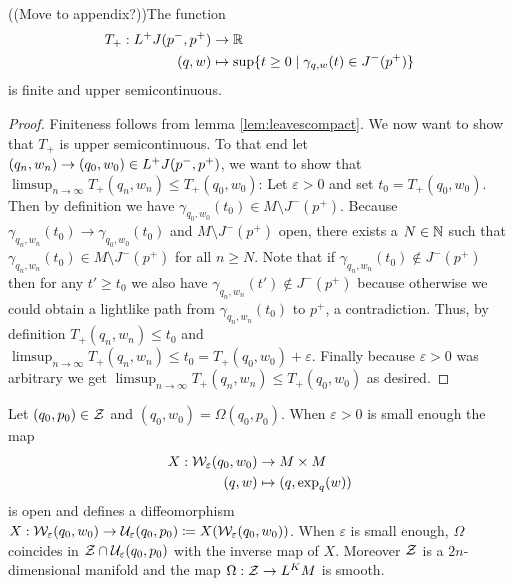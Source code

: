 \begin{lemma}\label{lem:Tprop}
    ((Move to appendix?))The function
    \begin{align*}
        T_+:L^+J(p^-,p^+)&\to \mathbb{R} \\
        (q,w)&\mapsto \sup \{ t\ge 0 \mid \gamma_{q,w}(t)\in J^-(p^+)\}
    \end{align*}
    is finite and upper semicontinuous.
\end{lemma}
\begin{proof}
    Finiteness follows from lemma \ref{lem:leavescompact}. We now want to show that $T_+$ is upper semicontinuous. To that end let $(q_n,w_n)\to (q_0,w_0)\in L^+J(p^-,p^+)$, we want to show that $\limsup_{n\to \infty} T_+(q_n,w_n) \leq T_+(q_0,w_0)$: Let $\varepsilon>0$ and set $t_0 = T_+(q_0,w_0)$. Then by definition we have $\gamma_{q_0,w_0}(t_0)\in M \setminus J^-(p^+)$. Because $\gamma_{q_n,w_n}(t_0) \to \gamma_{q_0,w_0}(t_0)$ and $M \setminus J^-(p^+)$ open, there exists a $N\in \mathbb{N}$ such that $\gamma_{q_n,w_n}(t_0)\in M \setminus J^-(p^+)$ for all $n\ge N$. Note that if $\gamma_{q_n,w_n}(t_0)\notin J^-(p^+)$ then for any $t'\ge t_0$ we also have $\gamma_{q_n,w_n}(t') \notin J^-(p^+)$ because otherwise we could obtain a lightlike path from $\gamma_{q_n,w_n}(t_0)$ to $p^+$, a contradiction. Thus, by definition $T_+(q_n,w_n)\leq t_0$ and 
    $\limsup_{n\to \infty} T_+(q_n,w_n) \leq t_0 = T_+(q_0,w_0)+\varepsilon$. Finally because $\varepsilon>0$ was arbitrary we get $\limsup_{n\to \infty} T_+(q_n,w_n) \leq T_+(q_0,w_0)$ as desired.
\end{proof}

\begin{lemma}\label{lem:omegacoords}
Let $(q_0,p_0)\in {\mathcal{Z}}$ and $(q_0,w_0)=\Omega(q_0,p_0)$. When $\varepsilon>0$ is small enough the map 
\begin{align*}
    X:{\mathcal{W}}_\varepsilon(q_0,w_0) &\to M\times M\\
    (q,w) &\mapsto (q,\exp_q(w))
\end{align*}
is open and defines a diffeomorphism $X:{\mathcal{W}}_\varepsilon(q_0,w_0)\to \mathcal{U}_\varepsilon(q_0,p_0) \coloneqq X({\mathcal{W}}_\varepsilon(q_0,w_0))$. When $\varepsilon$ is small enough, $\Omega$ coincides in ${\mathcal{Z}}\cap \mathcal{U}_\varepsilon(q_0,p_0)$ with the inverse map of $X$. Moreover ${\mathcal{Z}}$ is a $2n$-dimensional manifold and the map $\Omega:{\mathcal{Z}}\to L^KM$ is smooth.
\end{lemma}

